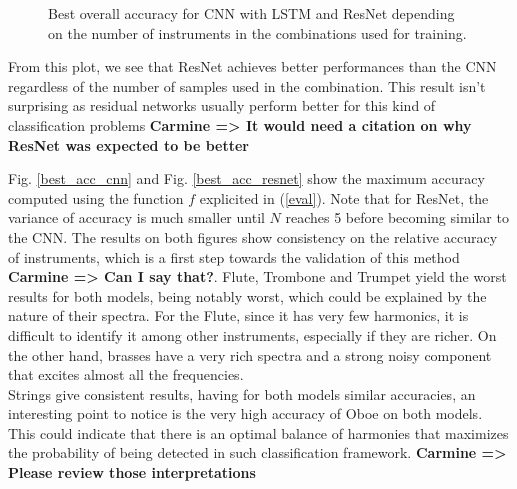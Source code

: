 \documentclass{article}
\newcommand{\carmine}[1]{\textbf{\color{red} Carmine => #1}}
\begin{document}
\begin{figure}
\caption{Best overall accuracy for CNN with LSTM and ResNet depending on the number of instruments in the combinations used for training. \label{cnn_vs_resnet}}
\end{figure}

From this plot, we see that ResNet achieves better performances than the CNN regardless of the number of samples used in the combination. This result isn't surprising as residual networks usually perform better for this kind of classification problems \carmine{It would need a citation on why ResNet was expected to be better}

Fig. \ref{best_acc_cnn} and Fig. \ref{best_acc_resnet} show the maximum accuracy computed using the function $f$ explicited in (\ref{eval}). Note that for ResNet, the variance of accuracy is much smaller until $N$ reaches 5 before becoming similar to the CNN. The results on both figures show consistency on the relative accuracy of instruments, which is a first step towards the validation of this method \carmine{Can I say that?}. Flute, Trombone and Trumpet yield the worst results for both models, being notably worst, which could be explained by the nature of their spectra. For the Flute, since it has very few harmonics, it is difficult to identify it among other instruments, especially if they are richer. On the other hand, brasses have a very rich spectra and a strong noisy component that excites almost all the frequencies.\\
Strings give consistent results, having for both models similar accuracies, an interesting point to notice is the very high accuracy of Oboe on both models. This could indicate that there is an optimal balance of harmonies that maximizes the probability of being detected in such classification framework.\carmine{Please review those interpretations}
\end{document}
